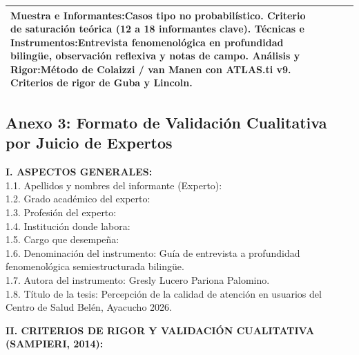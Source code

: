 \begin{table}[H]
\begin{tabularx}{\textwidth}{p{2.6cm}p{2.7cm}p{2.6cm}p{2.6cm}X}
\textbf{Muestra e Informantes:}\newline Casos tipo no probabilístico. Criterio de saturación teórica (12 a 18 informantes clave).\newline\newline 
\textbf{Técnicas e Instrumentos:}\newline Entrevista fenomenológica en profundidad bilingüe, observación reflexiva y notas de campo.\newline\newline 
\textbf{Análisis y Rigor:}\newline Método de Colaizzi / van Manen con ATLAS.ti v9. Criterios de rigor de Guba y Lincoln. \\
\bottomrule
\end{tabularx}
\end{table}

\vspace{0.5cm}

\subsection*{Anexo 3: Formato de Validación Cualitativa por Juicio de Expertos}
\label{anx:3_expertos}

\noindent\textbf{I. ASPECTOS GENERALES:}\\
1.1. Apellidos y nombres del informante (Experto): \hrulefill \\
1.2. Grado académico del experto: \hrulefill \\
1.3. Profesión del experto: \hrulefill \\
1.4. Institución donde labora: \hrulefill \\
1.5. Cargo que desempeña: \hrulefill \\
1.6. Denominación del instrumento: Guía de entrevista a profundidad fenomenológica semiestructurada bilingüe.\\
1.7. Autora del instrumento: Gresly Lucero Pariona Palomino.\\
1.8. Título de la tesis: Percepción de la calidad de atención en usuarios del Centro de Salud Belén, Ayacucho 2026.

\vspace{0.3cm}
\noindent\textbf{II. CRITERIOS DE RIGOR Y VALIDACIÓN CUALITATIVA (SAMPIERI, 2014):}

